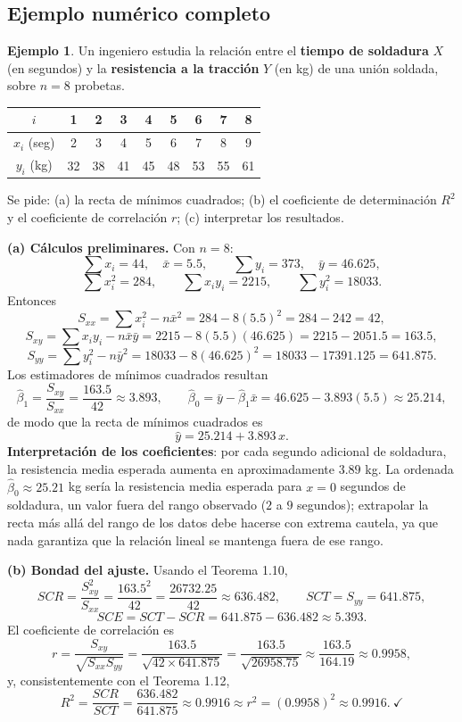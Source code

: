 \documentclass[11pt,a4paper]{article}
\theoremstyle{plain}
\theoremstyle{definition}
\newtheorem{ejemplo}[teorema]{Ejemplo}
\theoremstyle{remark}
\begin{document}
\subsection{Ejemplo numérico completo}

\begin{ejemplo}
Un ingeniero estudia la relación entre el \textbf{tiempo de soldadura} $X$ (en segundos) y la \textbf{resistencia a la tracción} $Y$ (en kg) de una unión soldada, sobre $n=8$ probetas.

\begin{center}
\begin{tabular}{c|cccccccc}
\toprule
$i$ & 1 & 2 & 3 & 4 & 5 & 6 & 7 & 8 \\
\midrule
$x_i$ (seg) & 2 & 3 & 4 & 5 & 6 & 7 & 8 & 9 \\
$y_i$ (kg) & 32 & 38 & 41 & 45 & 48 & 53 & 55 & 61 \\
\bottomrule
\end{tabular}
\end{center}

Se pide: (a) la recta de mínimos cuadrados; (b) el coeficiente de determinación $R^2$ y el coeficiente de correlación $r$; (c) interpretar los resultados.

\medskip
\noindent\textbf{(a) Cálculos preliminares.} Con $n=8$:
\[
\sum x_i=44,\quad \bar x=5.5, \qquad \sum y_i=373,\quad \bar y=46.625,
\]
\[
\sum x_i^2 = 284, \qquad \sum x_iy_i = 2215, \qquad \sum y_i^2=18033.
\]
Entonces
\[
S_{xx} = \sum x_i^2-n\bar x^2 = 284-8(5.5)^2 = 284-242=42,
\]
\[
S_{xy} = \sum x_iy_i - n\bar x\bar y = 2215-8(5.5)(46.625) = 2215-2051.5=163.5,
\]
\[
S_{yy} = \sum y_i^2-n\bar y^2 = 18033-8(46.625)^2 = 18033-17391.125 = 641.875.
\]
Los estimadores de mínimos cuadrados resultan
\[
\hat\beta_1 = \frac{S_{xy}}{S_{xx}} = \frac{163.5}{42} \approx 3.893, \qquad \hat\beta_0 = \bar y-\hat\beta_1\bar x = 46.625-3.893(5.5)\approx 25.214,
\]
de modo que la recta de mínimos cuadrados es
\[
\hat y = 25.214+3.893\,x.
\]
\textbf{Interpretación de los coeficientes}: por cada segundo adicional de soldadura, la resistencia media esperada aumenta en aproximadamente $3.89$ kg. La ordenada $\hat\beta_0\approx25.21$ kg sería la resistencia media esperada para $x=0$ segundos de soldadura, un valor fuera del rango observado ($2$ a $9$ segundos); extrapolar la recta más allá del rango de los datos debe hacerse con extrema cautela, ya que nada garantiza que la relación lineal se mantenga fuera de ese rango.

\medskip
\noindent\textbf{(b) Bondad del ajuste.} Usando el Teorema 1.10,
\[
SCR = \frac{S_{xy}^2}{S_{xx}} = \frac{163.5^2}{42} = \frac{26732.25}{42} \approx 636.482, \qquad SCT=S_{yy}=641.875,
\]
\[
SCE = SCT-SCR = 641.875-636.482 \approx 5.393.
\]
El coeficiente de correlación es
\[
r = \frac{S_{xy}}{\sqrt{S_{xx}S_{yy}}} = \frac{163.5}{\sqrt{42\times 641.875}} = \frac{163.5}{\sqrt{26958.75}} \approx \frac{163.5}{164.19} \approx 0.9958,
\]
y, consistentemente con el Teorema 1.12,
\[
R^2 = \frac{SCR}{SCT} = \frac{636.482}{641.875} \approx 0.9916 \approx r^2 = (0.9958)^2 \approx 0.9916. \ \checkmark
\]


\end{ejemplo}
\end{document}
